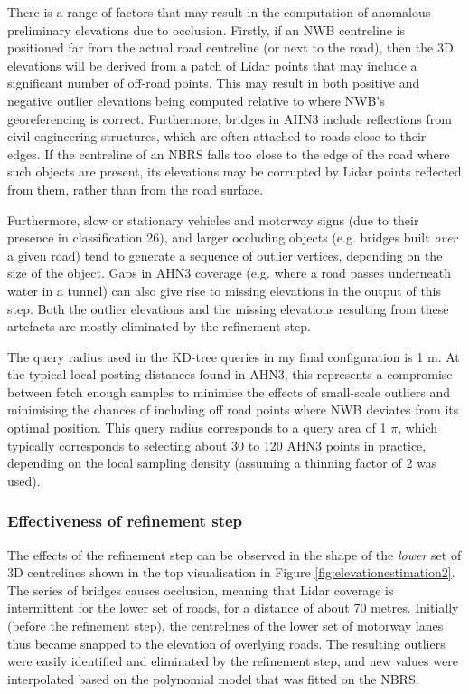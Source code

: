 There is a range of factors that may result in the computation of anomalous preliminary elevations due to occlusion. Firstly, if an NWB centreline is positioned far from the actual road centreline (or next to the road), then the 3D elevations will be derived from a patch of Lidar points that may include a significant number of off-road points. This may result in both positive and negative outlier elevations being computed relative to where NWB's georeferencing is correct. Furthermore, bridges in AHN3 include reflections from civil engineering structures, which are often attached to roads close to their edges. If the centreline of an NBRS falls too close to the edge of the road where such objects are present, its elevations may be corrupted by Lidar points reflected from them, rather than from the road surface.

Furthermore, slow or stationary vehicles and motorway signs (due to their presence in classification 26), and larger occluding objects (e.g. bridges built \textit{over} a given road) tend to generate a sequence of outlier vertices, depending on the size of the object. Gaps in AHN3 coverage (e.g. where a road passes underneath water in a tunnel) can also give rise to missing elevations in the output of this step. Both the outlier elevations and the missing elevations resulting from these artefacts are mostly eliminated by the refinement step.

The query radius used in the KD-tree queries in my final configuration is 1 m. At the typical local posting distances found in AHN3, this represents a compromise between fetch enough samples to minimise the effects of small-scale outliers and minimising the chances of including off road points where NWB deviates from its optimal position. This query radius corresponds to a query area of 1 $\pi$, which typically corresponds to selecting about 30 to 120 AHN3 points in practice, depending on the local sampling density (assuming a thinning factor of 2 was used).

\subsubsection{Effectiveness of refinement step}

The effects of the refinement step can be observed in the shape of the \textit{lower} set of 3D centrelines shown in the top visualisation in Figure \ref{fig:elevationestimation2}. The series of bridges causes occlusion, meaning that Lidar coverage is intermittent for the lower set of roads, for a distance of about 70 metres. Initially (before the refinement step), the centrelines of the lower set of motorway lanes thus became snapped to the elevation of overlying roads. The resulting outliers were easily identified and eliminated by the refinement step, and new values were interpolated based on the polynomial model that was fitted on the NBRS.

